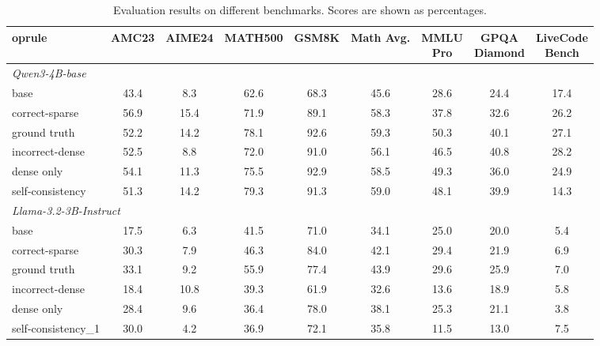 \documentclass{article}
\begin{document}
\begin{table}[t]
\caption{Evaluation results on different benchmarks. Scores are shown as percentages.}
\label{tab:benchmark_results}
\centering
\small
\setlength{\tabcolsep}{4pt}

\begin{tabular}{lcccccccc}
	oprule
& AMC23 
& AIME24 
& MATH500 
& GSM8K 
& Math Avg.
& \shortstack{MMLU\\Pro}
& \shortstack{GPQA\\Diamond}
& \shortstack{LiveCode\\Bench} \\
\midrule

\multicolumn{9}{l}{\textit{Qwen3-4B-base}} \\
\midrule

base
& 43.4 & 8.3 & 62.6 & 68.3 & 45.6
& 28.6 & 24.4 & 17.4 \\

correct-sparse
& 56.9 & 15.4 & 71.9 & 89.1 & 58.3
& 37.8 & 32.6 & 26.2 \\

ground truth 
& 52.2 & 14.2 & 78.1 & 92.6 & 59.3
& 50.3 & 40.1 & 27.1 \\

incorrect-dense
& 52.5 & 8.8 & 72.0 & 91.0 & 56.1
& 46.5 & 40.8 & 28.2 \\


dense only
& 54.1 & 11.3 & 75.5 & 92.9 & 58.5
& 49.3 & 36.0 & 24.9 \\

self-consistency
& 51.3 & 14.2 & 79.3 & 91.3 & 59.0
& 48.1 & 39.9 & 14.3 \\

\midrule

\multicolumn{9}{l}{\textit{Llama-3.2-3B-Instruct}} \\
\midrule

base
& 17.5 & 6.3 & 41.5 & 71.0 & 34.1
& 25.0 & 20.0 & 5.4 \\

correct-sparse 
& 30.3 & 7.9 & 46.3 & 84.0 & 42.1
& 29.4 & 21.9 & 6.9 \\

ground truth 
& 33.1 & 9.2 & 55.9 & 77.4 & 43.9
& 29.6 & 25.9 & 7.0 \\

incorrect-dense
& 18.4 & 10.8 & 39.3 & 61.9 & 32.6
& 13.6 & 18.9 & 5.8 \\

dense only
& 28.4 & 9.6 & 36.4 & 78.0 & 38.1
& 25.3 & 21.1 & 3.8 \\

self-consistency_1
& 30.0 & 4.2 & 36.9 & 72.1 & 35.8
& 11.5 & 13.0 & 7.5 \\

\bottomrule
\end{tabular}
\end{table}
\end{document}
